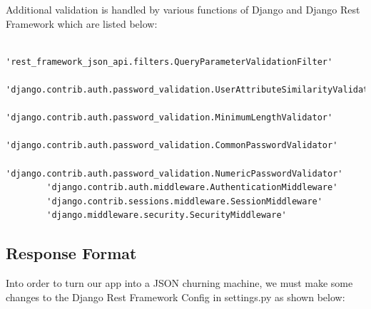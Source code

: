 \documentclass{article}
\begin{document}
    Additional validation is handled by various functions of Django and Django Rest Framework which are listed below:
    
    \begin{verbatim}
        'rest_framework_json_api.filters.QueryParameterValidationFilter'
        'django.contrib.auth.password_validation.UserAttributeSimilarityValidator' 
        'django.contrib.auth.password_validation.MinimumLengthValidator'
        'django.contrib.auth.password_validation.CommonPasswordValidator'
        'django.contrib.auth.password_validation.NumericPasswordValidator'
        'django.contrib.auth.middleware.AuthenticationMiddleware'
        'django.contrib.sessions.middleware.SessionMiddleware'
        'django.middleware.security.SecurityMiddleware'
    \end{verbatim}

    \subsection{Response Format}
        Into order to turn our app into a JSON churning machine, we must make some changes to the Django Rest Framework Config in settings.py as shown below:
        
\end{document}
